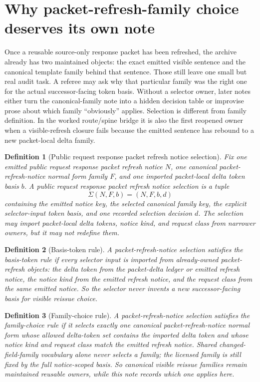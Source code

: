 \documentclass[11pt]{article}
\newtheorem{definition}{Definition}
\begin{document}
\section{Why packet-refresh-family choice deserves its own note}
Once a reusable source-only response packet has been refreshed, the archive already has two maintained objects: the exact emitted visible sentence and the canonical template family behind that sentence. Those still leave one small but real audit task. A referee may ask why that particular family was the right one for the actual successor-facing token basis. Without a selector owner, later notes either turn the canonical-family note into a hidden decision table or improvise prose about which family ``obviously'' applies. Selection is different from family definition. In the worked route/spine bridge it is also the first reopened owner when a visible-refresh closure fails because the emitted sentence has rebound to a new packet-local delta family.

\begin{definition}[Public request response packet refresh notice selection]
Fix one emitted public request response packet refresh notice $N$, one canonical packet-refresh-notice normal form family $F$, and one imported packet-local delta token basis $b$. A \emph{public request response packet refresh notice selection} is a tuple
\[
\Sigma(N,F,b)=(N,F,b,d)
\]
containing the emitted notice key, the selected canonical family key, the explicit selector-input token basis, and one recorded selection decision $d$.
The selection may import packet-local delta tokens, notice kind, and request class from narrower owners, but it may not redefine them.
\end{definition}

\begin{definition}[Basis-token rule]
A packet-refresh-notice selection satisfies the \emph{basis-token rule} if every selector input is imported from already-owned packet-refresh objects: the delta token from the packet-delta ledger or emitted refresh notice, the notice kind from the emitted refresh notice, and the request class from the same emitted notice. So the selector never invents a new successor-facing basis for visible reissue choice.
\end{definition}

\begin{definition}[Family-choice rule]
A packet-refresh-notice selection satisfies the \emph{family-choice rule} if it selects exactly one canonical packet-refresh-notice normal form whose allowed delta-token set contains the imported delta token and whose notice kind and request class match the emitted refresh notice. Shared changed-field-family vocabulary alone never selects a family; the licensed family is still fixed by the full notice-scoped basis. So canonical visible reissue families remain maintained reusable owners, while this note records which one applies here.
\end{definition}
\end{document}
